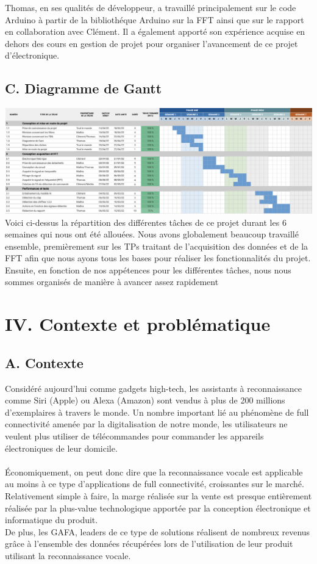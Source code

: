 \documentclass[a4paper,11pt]{book}
\begin{document}
Thomas, en ses qualités de développeur, a travaillé principalement sur le code Arduino à partir de la bibliothéque Arduino sur la FFT ainsi que sur le rapport en collaboration avec Clément. Il a également apporté son expérience acquise en dehors des cours en gestion de projet pour organiser l'avancement de ce projet d'électronique. \\

\subsection*{C. Diagramme de Gantt} 

\includegraphics[width=\textwidth]{Diagramme de gantt.png} \break
Voici ci-dessus la répartition des différentes tâches de ce projet durant les 6 semaines qui nous ont été allouées. Nous avons globalement beaucoup travaillé ensemble, premièrement sur les TPs traitant de l'acquisition des données et de la FFT afin que nous ayons tous les bases pour réaliser les fonctionnalités du projet. Ensuite, en fonction de nos appétences pour les différentes tâches, nous nous sommes organisés de manière à avancer assez rapidement
\newpage
\section*{IV. Contexte et problématique}
\subsection*{A. Contexte}
Considéré aujourd'hui comme gadgets high-tech, les assistants à reconnaissance comme Siri (Apple) ou Alexa (Amazon) sont vendus à plus de 200 millions d'exemplaires à travers le monde. Un nombre important lié au phénomène de full connectivité amenée par la digitalisation de notre monde, les utilisateurs ne veulent plus utiliser de télécommandes pour commander les appareils électroniques de leur domicile. \\ \\
Économiquement, on peut donc dire que la reconnaissance vocale est applicable au moins à ce type d'applications de full connectivité, croissantes sur le marché. Relativement simple à faire, la marge réalisée sur la vente est presque entièrement réalisée par la plus-value technologique apportée par la conception électronique et informatique du produit. \\ 
De plus, les GAFA, leaders de ce type de solutions réalisent de nombreux revenus grâce à l'ensemble des données récupérées lors de l'utilisation de leur produit utilisant la reconnaissance vocale. \\ \\
\end{document}
